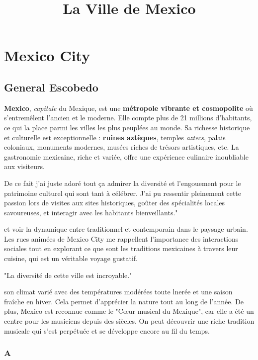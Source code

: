 \documentclass[12pt, a4paper]{article}
\title{La Ville de Mexico}
\author{}
\date{}
\begin{document}
   \maketitle

\section*{Mexico City}

\subsection{General Escobedo}

\textbf{Mexico}, \textit{capitale} du Mexique, est une \textbf{métropole vibrante et cosmopolite} où s'entremêlent l'ancien et le moderne. Elle compte plus de 21 millions d'habitants, ce qui la place parmi les villes les plus peuplées au monde. Sa richesse historique et culturelle est exceptionnelle : \textbf{ruines aztèques}, temples \textit{aztecs}, palais coloniaux, monuments modernes, musées riches de trésors artistiques, etc. La gastronomie mexicaine, riche et variée, offre une expérience culinaire inoubliable aux visiteurs.

De ce fait j'ai juste adoré tout ça admirer la diversité et l’engouement pour le patrimoine culturel qui sont tant à célébrer. J’ai pu ressentir pleinement cette passion lors de visites aux sites historiques, goûter des spécialités locales savoureuses, et interagir avec les habitants bienveillants."

et voir la dynamique entre traditionnel et contemporain dans le paysage urbain. Les rues animées de Mexico City me rappellent l’importance des interactions sociales tout en explorant ce que sont les traditions mexicaines à travers leur cuisine, qui est un véritable voyage gustatif.

"La diversité de cette ville est incroyable."

son climat varié avec des températures modérées toute lnerée et une saison fraîche en hiver. Cela permet d’apprécier la nature tout au long de l’année. De plus, Mexico est reconnue comme le "Cœur musical du Mexique", car elle a été un centre pour les musiciens depuis des siècles. On peut découvrir une riche tradition musicale qui s'est perpétuée et se développe encore au fil du temps.


\subsubsection{A}
\end{document}
